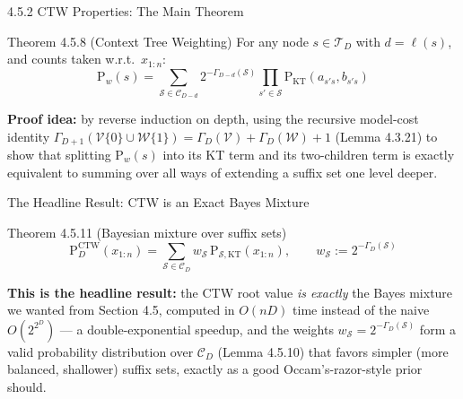 \documentclass[aspectratio=169,10pt]{beamer}
\newcommand{\PKT}{\mathrm{P}_{\mathrm{KT}}}
\newcommand{\Pw}{\mathrm{P}_w}
\begin{document}
\begin{frame}{4.5.2 CTW Properties: The Main Theorem}
\begin{block}{Theorem 4.5.8 (Context Tree Weighting)}
For any node $s\in\mathcal T_D$ with $d=\ell(s)$, and counts taken w.r.t.\ $x_{1:n}$:
$$
\Pw(s) = \sum_{\mathcal S\in\mathcal C_{D-d}} 2^{-\Gamma_{D-d}(\mathcal S)}
\prod_{s'\in\mathcal S}\PKT(a_{s's},b_{s's})
$$
\end{block}
\textbf{Proof idea:} by reverse induction on depth, using the recursive model-cost identity
$\Gamma_{D+1}(\mathcal V\{0\}\cup\mathcal W\{1\})=\Gamma_D(\mathcal V)+\Gamma_D(\mathcal W)+1$
(Lemma 4.3.21) to show that splitting $\Pw(s)$ into its KT term and its two-children term is
exactly equivalent to summing over all ways of extending a suffix set one level deeper.
\end{frame}

\begin{frame}{The Headline Result: CTW is an Exact Bayes Mixture}
\begin{block}{Theorem 4.5.11 (Bayesian mixture over suffix sets)}
$$
\mathrm{P}_D^{\mathrm{CTW}}(x_{1:n}) = \sum_{\mathcal S\in\mathcal C_D} w_{\mathcal S}\,
\mathrm{P}_{\mathcal S,\mathrm{KT}}(x_{1:n}), \qquad w_{\mathcal S}:=2^{-\Gamma_D(\mathcal S)}
$$
\end{block}
\textbf{This is the headline result:} the CTW root value \emph{is exactly} the Bayes mixture
we wanted from Section 4.5, computed in $O(nD)$ time instead of the naive $O(2^{2^D})$ — a
double-exponential speedup, and the weights $w_{\mathcal S}=2^{-\Gamma_D(\mathcal S)}$ form a
valid probability distribution over $\mathcal C_D$ (Lemma 4.5.10) that favors simpler
(more balanced, shallower) suffix sets, exactly as a good Occam's-razor-style prior should.
\end{frame}
\end{document}
